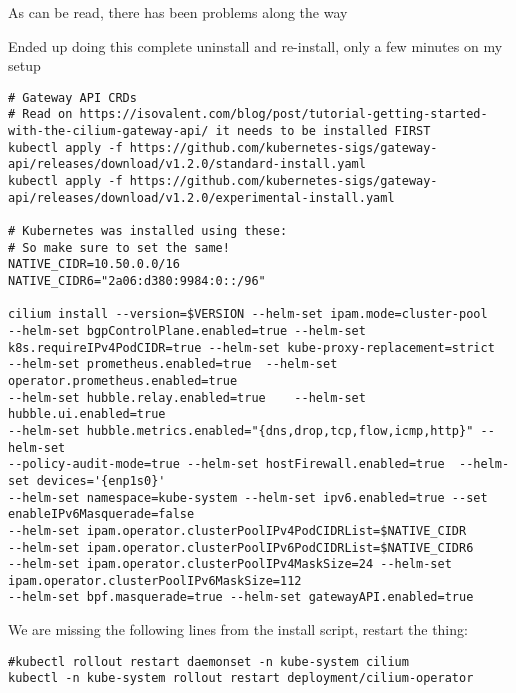 \documentclass[Screen16to9,17pt]{foils}
\begin{document}
\begin{list2}
\item As can be read, there has been problems along the way
\item Ended up doing this complete uninstall and re-install, only a few minutes on my setup
\end{list2}


\begin{verbatim}
# Gateway API CRDs
# Read on https://isovalent.com/blog/post/tutorial-getting-started-with-the-cilium-gateway-api/ it needs to be installed FIRST
kubectl apply -f https://github.com/kubernetes-sigs/gateway-api/releases/download/v1.2.0/standard-install.yaml
kubectl apply -f https://github.com/kubernetes-sigs/gateway-api/releases/download/v1.2.0/experimental-install.yaml

# Kubernetes was installed using these:
# So make sure to set the same!
NATIVE_CIDR=10.50.0.0/16
NATIVE_CIDR6="2a06:d380:9984:0::/96"

cilium install --version=$VERSION --helm-set ipam.mode=cluster-pool
--helm-set bgpControlPlane.enabled=true --helm-set k8s.requireIPv4PodCIDR=true --helm-set kube-proxy-replacement=strict
--helm-set prometheus.enabled=true 	--helm-set operator.prometheus.enabled=true
--helm-set hubble.relay.enabled=true 	--helm-set hubble.ui.enabled=true
--helm-set hubble.metrics.enabled="{dns,drop,tcp,flow,icmp,http}" --helm-set
--policy-audit-mode=true --helm-set hostFirewall.enabled=true  --helm-set devices='{enp1s0}'
--helm-set namespace=kube-system --helm-set ipv6.enabled=true --set enableIPv6Masquerade=false
--helm-set ipam.operator.clusterPoolIPv4PodCIDRList=$NATIVE_CIDR
--helm-set ipam.operator.clusterPoolIPv6PodCIDRList=$NATIVE_CIDR6
--helm-set ipam.operator.clusterPoolIPv4MaskSize=24 --helm-set ipam.operator.clusterPoolIPv6MaskSize=112
--helm-set bpf.masquerade=true --helm-set gatewayAPI.enabled=true
\end{verbatim}




We are missing the following lines from the install script, restart the thing:
\begin{verbatim}
#kubectl rollout restart daemonset -n kube-system cilium
kubectl -n kube-system rollout restart deployment/cilium-operator
\end{verbatim}
\end{document}
